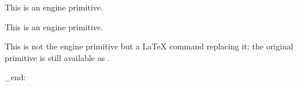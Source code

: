 \begin{function}[]
  {
    \pageshrink
  }
  \begin{syntax}
  \end{syntax}
  This is an engine primitive.
\end{function}



\begin{function}[]
  {
    \pagestyle
  }
  \begin{syntax}
  \end{syntax}

\end{function}



\begin{function}[]
  {
    \pagetotal
  }
  \begin{syntax}
  \end{syntax}
  This is an engine primitive.
\end{function}



\begin{function}[]
  {
    \paperheight
  }
  \begin{syntax}
  \end{syntax}

\end{function}



\begin{function}[]
  {
    \paperwidth
  }
  \begin{syntax}
  \end{syntax}

\end{function}



\begin{function}[]
  {
    \par
  }

  This is not the engine primitive  but a \LaTeX{} command replacing
  it; the original primitive is still available as .
\end{function}



\begin{function}[]
  {
    \para_end:
  }
  \begin{syntax}
  \end{syntax}

\end{function}



